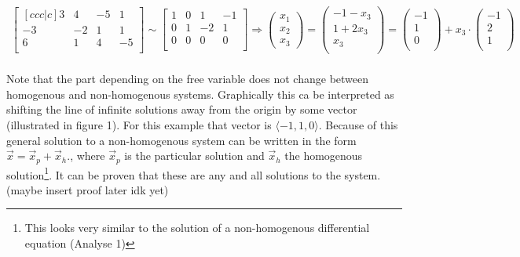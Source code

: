 \documentclass[11pt, a4paper]{article}
\begin{document}
\begin{align*}
  \begin{bmatrix}[ccc|c]
    3 & 4 & -5 & 1\\
    -3 & -2 & 1 & 1\\
    6 & 1 & 4 & -5\\
  \end{bmatrix}
  \sim
  \begin{bmatrix}
    1 & 0 & 1 & -1\\
    0 & 1 & -2 & 1\\
    0 & 0 & 0 & 0\\
  \end{bmatrix}
  \Rightarrow
  \begin{pmatrix} x_1 \\ x_2 \\ x_3 \end{pmatrix}
  = \begin{pmatrix} -1 - x_3\\ 1 + 2x_3\\ x_3\\ \end{pmatrix}
  = \begin{pmatrix} -1\\ 1\\ 0\\ \end{pmatrix} + x_3 \cdot \begin{pmatrix} -1\\ 2\\ 1\\ \end{pmatrix}
\end{align*}
\\
Note that the part depending on the free variable does not change between homogenous 
and non-homogenous systems. Graphically this ca be interpreted as shifting the line of 
infinite solutions away  from the origin by some vector (illustrated in figure 1). For this example that vector is 
$\langle -1, 1, 0 \rangle$. Because of this general solution to a non-homogenous system can
be written in the form  $\vec{x} = \vec{x}_p + \vec{x}_h$., where $\vec{x}_p$ is the particular
solution and $\vec{x}_h$ the homogenous solution\footnote{This looks very similar to the solution of a 
non-homogenous differential equation (Analyse 1)}. 
It can be proven that these are any and all solutions to the system. (maybe insert proof later idk yet)
\end{document}
